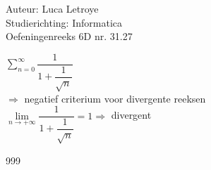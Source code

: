 \documentclass[a4paper]{article}
\begin{document}
  
\noindent \large Auteur: Luca Letroye \\
\noindent \large Studierichting: Informatica\\
\noindent \large Oefeningenreeks 6D nr. 31.27

\medskip
\normalsize

$ \displaystyle\sum_{n=0}^{\infty} \dfrac{1}{1+\dfrac{1}{\sqrt{n}}}$\\

$\Rightarrow $ negatief criterium voor divergente reeksen\\

$\lim\limits_{n\rightarrow +\infty} \dfrac{1}{1+\dfrac{1}{\sqrt{n}}} = 1 \Rightarrow$ divergent\\










\begin{thebibliography}{999}
\end{thebibliography}
\end{document}
